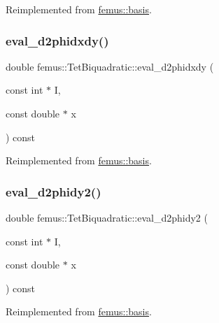 Reimplemented from \mbox{\hyperlink{classfemus_1_1basis_a0a9839e75d1c9c8302486fc072eed028}{femus\+::basis}}.

\mbox{\label{classfemus_1_1_tet_biquadratic_af239043a31782f74d867ecbb4f654689}} 
\subsubsection{\texorpdfstring{eval\+\_\+d2phidxdy()}{eval\_d2phidxdy()}}
{\footnotesize\ttfamily double femus\+::\+Tet\+Biquadratic\+::eval\+\_\+d2phidxdy (\begin{DoxyParamCaption}\item[{const int $\ast$}]{I,  }\item[{const double $\ast$}]{x }\end{DoxyParamCaption}) const\hspace{0.3cm}{\ttfamily [virtual]}}



Reimplemented from \mbox{\hyperlink{classfemus_1_1basis_ac9feaf9e60421143db2a3708f3c7fa48}{femus\+::basis}}.

\mbox{\label{classfemus_1_1_tet_biquadratic_a2095b54326d389269cd4fff0724138aa}} 
\subsubsection{\texorpdfstring{eval\+\_\+d2phidy2()}{eval\_d2phidy2()}}
{\footnotesize\ttfamily double femus\+::\+Tet\+Biquadratic\+::eval\+\_\+d2phidy2 (\begin{DoxyParamCaption}\item[{const int $\ast$}]{I,  }\item[{const double $\ast$}]{x }\end{DoxyParamCaption}) const\hspace{0.3cm}{\ttfamily [virtual]}}



Reimplemented from \mbox{\hyperlink{classfemus_1_1basis_a0febb29fe4b32213ff8d6d428f7241cd}{femus\+::basis}}.

